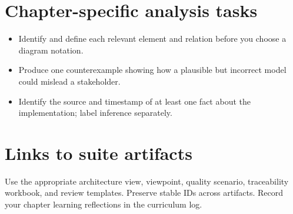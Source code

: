 \documentclass[10pt,letterpaper]{article}
\begin{document}
\section{Chapter-specific analysis tasks}
\begin{itemize}
\item Identify and define each relevant element and relation before you choose a diagram notation.
\item Produce one counterexample showing how a plausible but incorrect model could mislead a stakeholder.
\item Identify the source and timestamp of at least one fact about the implementation; label inference separately.
\end{itemize}
\section{Links to suite artifacts}
Use the appropriate architecture view, viewpoint, quality scenario, traceability workbook, and review templates. Preserve stable IDs across artifacts. Record your chapter learning reflections in the curriculum log.
\end{document}
